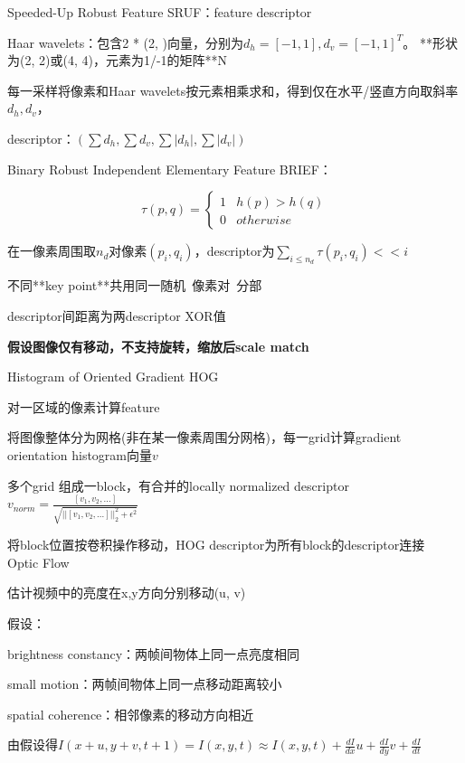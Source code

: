 \documentclass[UTF8]{ctexart}
\begin{document}
  Speeded-Up Robust Feature SRUF：feature descriptor

  \quad Haar wavelets：包含2 * (2, )向量，分别为$d_h = [-1, 1], d_v = [-1, 1]^T$。 **形状为(2, 2)或(4, 4)，元素为1/-1的矩阵**N
  
  \quad 每一采样将像素和Haar wavelets按元素相乘求和，得到仅在水平/竖直方向取斜率$d_h, d_v$，

  \quad descriptor：$(\sum d_h, \sum d_v, \sum |d_h|, \sum |d_v|)$

  Binary Robust Independent Elementary Feature BRIEF：

  \quad \begin{equation*}
      \tau(p, q) = \begin{cases}
      1 & h(p) > h(q)\\
      0 & otherwise
      \end{cases}
    \end{equation*}

  \quad 在一像素周围取$n_d$对像素$(p_i, q_i)$，descriptor为$\sum_{i \leq n_d} \tau(p_i, q_i) << i$

  \quad \quad 不同**key point**共用同一随机\ 像素对\ 分部

  \quad descriptor间距离为两descriptor XOR值

  \quad \textbf{假设图像仅有移动，不支持旋转，缩放后scale match}
  
  Histogram of Oriented Gradient HOG 

  \quad 对一区域的像素计算feature

  \quad 将图像整体分为网格(非在某一像素周围分网格)，每一grid计算gradient orientation histogram向量$v$

  \quad 多个grid 组成一block，有合并的locally normalized descriptor$v_{norm} = \frac{[v_1, v_2, ...]}{\sqrt{||[v_1, v_2, ...]||_2^2 + \epsilon^2}}$

  \quad 将block位置按卷积操作移动，HOG descriptor为所有block的descriptor连接\\
Optic Flow

  估计视频中的亮度在x,y方向分别移动(u, v)

  假设：

  \quad brightness constancy：两帧间物体上同一点亮度相同

  \quad small motion：两帧间物体上同一点移动距离较小

  \quad spatial coherence：相邻像素的移动方向相近
  
  由假设得$I(x + u, y + v, t + 1) = I(x, y, t) \approx I(x, y, t) + \frac{dI}{dx}u + \frac{dI}{dy}v + \frac{dI}{dt}$
\end{document}
